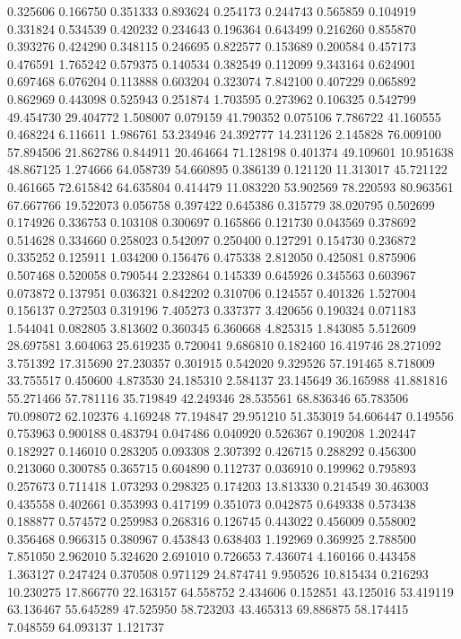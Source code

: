 0.325606
0.166750
0.351333
0.893624
0.254173
0.244743
0.565859
0.104919
0.331824
0.534539
0.420232
0.234643
0.196364
0.643499
0.216260
0.855870
0.393276
0.424290
0.348115
0.246695
0.822577
0.153689
0.200584
0.457173
0.476591
1.765242
0.579375
0.140534
0.382549
0.112099
9.343164
0.624901
0.697468
6.076204
0.113888
0.603204
0.323074
7.842100
0.407229
0.065892
0.862969
0.443098
0.525943
0.251874
1.703595
0.273962
0.106325
0.542799
49.454730
29.404772
1.508007
0.079159
41.790352
0.075106
7.786722
41.160555
0.468224
6.116611
1.986761
53.234946
24.392777
14.231126
2.145828
76.009100
57.894506
21.862786
0.844911
20.464664
71.128198
0.401374
49.109601
10.951638
48.867125
1.274666
64.058739
54.660895
0.386139
0.121120
11.313017
45.721122
0.461665
72.615842
64.635804
0.414479
11.083220
53.902569
78.220593
80.963561
67.667766
19.522073
0.056758
0.397422
0.645386
0.315779
38.020795
0.502699
0.174926
0.336753
0.103108
0.300697
0.165866
0.121730
0.043569
0.378692
0.514628
0.334660
0.258023
0.542097
0.250400
0.127291
0.154730
0.236872
0.335252
0.125911
1.034200
0.156476
0.475338
2.812050
0.425081
0.875906
0.507468
0.520058
0.790544
2.232864
0.145339
0.645926
0.345563
0.603967
0.073872
0.137951
0.036321
0.842202
0.310706
0.124557
0.401326
1.527004
0.156137
0.272503
0.319196
7.405273
0.337377
3.420656
0.190324
0.071183
1.544041
0.082805
3.813602
0.360345
6.360668
4.825315
1.843085
5.512609
28.697581
3.604063
25.619235
0.720041
9.686810
0.182460
16.419746
28.271092
3.751392
17.315690
27.230357
0.301915
0.542020
9.329526
57.191465
8.718009
33.755517
0.450600
4.873530
24.185310
2.584137
23.145649
36.165988
41.881816
55.271466
57.781116
35.719849
42.249346
28.535561
68.836346
65.783506
70.098072
62.102376
4.169248
77.194847
29.951210
51.353019
54.606447
0.149556
0.753963
0.900188
0.483794
0.047486
0.040920
0.526367
0.190208
1.202447
0.182927
0.146010
0.283205
0.093308
2.307392
0.426715
0.288292
0.456300
0.213060
0.300785
0.365715
0.604890
0.112737
0.036910
0.199962
0.795893
0.257673
0.711418
1.073293
0.298325
0.174203
13.813330
0.214549
30.463003
0.435558
0.402661
0.353993
0.417199
0.351073
0.042875
0.649338
0.573438
0.188877
0.574572
0.259983
0.268316
0.126745
0.443022
0.456009
0.558002
0.356468
0.966315
0.380967
0.453843
0.638403
1.192969
0.369925
2.788500
7.851050
2.962010
5.324620
2.691010
0.726653
7.436074
4.160166
0.443458
1.363127
0.247424
0.370508
0.971129
24.874741
9.950526
10.815434
0.216293
10.230275
17.866770
22.163157
64.558752
2.434606
0.152851
43.125016
53.419119
63.136467
55.645289
47.525950
58.723203
43.465313
69.886875
58.174415
7.048559
64.093137
1.121737
